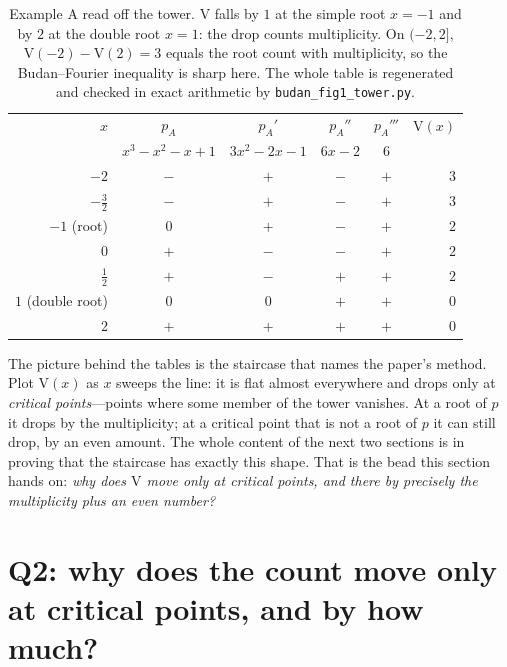 \documentclass[11pt]{article}
\newcommand{\lean}[1]{\texttt{#1}}
\newcommand{\V}{\mathrm{V}}
\begin{document}
\begin{table}[htbp]
\centering\small
{}
\begin{tabular}{@{}rccccr@{}}
\toprule
\rowcolor{ggteal!18}
$x$ & $p_A$ & $p_A'$ & $p_A''$ & $p_A'''$ & $\V(x)$ \\
    & {\scriptsize$x^3{-}x^2{-}x{+}1$} & {\scriptsize$3x^2{-}2x{-}1$} & {\scriptsize$6x{-}2$} & {\scriptsize$6$} & \\
\midrule
$-2$            & $-$ & $+$ & $-$ & $+$ & $3$ \\
$-\tfrac32$     & $-$ & $+$ & $-$ & $+$ & $3$ \\
$-1$ {\scriptsize(root)}        & $0$ & $+$ & $-$ & $+$ & $2$ \\
$0$             & $+$ & $-$ & $-$ & $+$ & $2$ \\
$\tfrac12$      & $+$ & $-$ & $+$ & $+$ & $2$ \\
$1$ {\scriptsize(double root)}  & $0$ & $0$ & $+$ & $+$ & $0$ \\
$2$             & $+$ & $+$ & $+$ & $+$ & $0$ \\
\bottomrule
\end{tabular}
\caption{Example A read off the tower. $\V$ falls by $1$ at the simple root $x=-1$ and by $2$ at the
double root $x=1$: the drop counts multiplicity. On $(-2,2]$, $\V(-2)-\V(2)=3$ equals the root count
with multiplicity, so the Budan--Fourier inequality is sharp here. The whole table is regenerated and
checked in exact arithmetic by \lean{budan\_fig1\_tower.py}.}
\label{tab:signsA}
\end{table}

The picture behind the tables is the staircase that names the paper's method. Plot $\V(x)$ as $x$
sweeps the line: it is flat almost everywhere and drops only at \emph{critical points}---points
where some member of the tower vanishes. At a root of $p$ it drops by the multiplicity; at a
critical point that is not a root of $p$ it can still drop, by an even amount. The whole content of
the next two sections is in proving that the staircase has exactly this shape. That is the bead this
section hands on: \emph{why does $\V$ move only at critical points, and there by precisely the
multiplicity plus an even number?}

\section{Q2: why does the count move only at critical points, and by how much?}\label{sec:q2}
\end{document}
